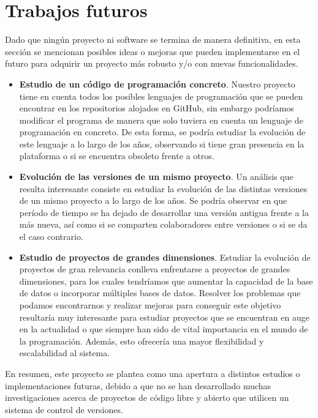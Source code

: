 \documentclass[a4paper, 12pt]{book}
\begin{document}
\section{Trabajos futuros}
\label{sec:trabajos_futuros}

Dado que ningún proyecto ni software se termina de manera definitiva, en esta sección se mencionan posibles ideas o mejoras que pueden implementarse en el futuro para adquirir un proyecto más
robusto y/o con nuevas funcionalidades.

\begin{itemize}
  \item \textbf{Estudio de un código de programación concreto}. Nuestro proyecto tiene en cuenta todos los posibles lenguajes de programación que se pueden encontrar en los repositorios alojados
  en GitHub, sin embargo podríamos modificar el programa de manera que solo tuviera en cuenta un lenguaje de programación en concreto. De esta forma, se podría estudiar la evolución de este lenguaje 
  a lo largo de los años, observando si tiene gran presencia en la plataforma o si se encuentra obsoleto frente a otros.
  \item \textbf{Evolución de las versiones de un mismo proyecto}. Un análisis que resulta interesante consiste en estudiar la evolución de las distintas versiones de un mismo proyecto a lo largo de los años.
  Se podría observar en que período de tiempo se ha dejado de desarrollar una versión antigua frente a la más nueva, así como si se comparten colaboradores entre versiones o si se da el caso contrario.
  \item \textbf{Estudio de proyectos de grandes dimensiones}. Estudiar la evolución de proyectos de gran relevancia conlleva enfrentarse a proyectos de grandes dimensiones, para los cuales tendríamos
  que aumentar la capacidad de la base de datos o incorporar múltiples bases de datos. Resolver los problemas que podamos encontrarnos y realizar mejoras para conseguir este objetivo resultaría muy
  interesante para estudiar proyectos que se encuentran en auge en la actualidad o que siempre han sido de vital importancia en el mundo de la programación. Además, esto ofrecería una mayor flexibilidad
  y escalabilidad al sistema.
\end{itemize}

En resumen, este proyecto se plantea como una apertura a distintos estudios o implementaciones futuras, debido a que no se han desarrollado muchas investigaciones acerca de proyectos de código libre 
y abierto que utilicen un sistema de control de versiones.
\end{document}
